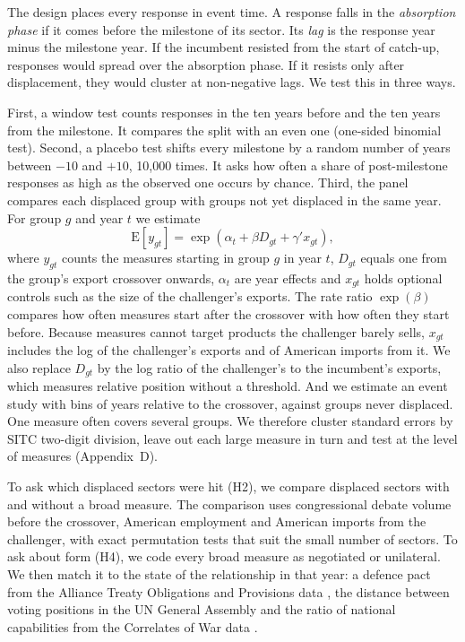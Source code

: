 \documentclass[review,authoryear,12pt]{elsarticle}
\begin{document}
The design places every response in event time. A response falls in the \emph{absorption phase} if it comes before the milestone of its sector. Its \emph{lag} is the response year minus the milestone year. If the incumbent resisted from the start of catch-up, responses would spread over the absorption phase. If it resists only after displacement, they would cluster at non-negative lags. We test this in three ways.

First, a window test counts responses in the ten years before and the ten years from the milestone. It compares the split with an even one (one-sided binomial test). Second, a placebo test shifts every milestone by a random number of years between $-10$ and $+10$, 10,000 times. It asks how often a share of post-milestone responses as high as the observed one occurs by chance. Third, the panel compares each displaced group with groups not yet displaced in the same year. For group $g$ and year $t$ we estimate
\begin{equation}
\mathrm{E}[y_{gt}] = \exp(\alpha_t + \beta D_{gt} + \gamma' x_{gt}),
\end{equation}
where $y_{gt}$ counts the measures starting in group $g$ in year $t$, $D_{gt}$ equals one from the group's export crossover onwards, $\alpha_t$ are year effects and $x_{gt}$ holds optional controls such as the size of the challenger's exports. The rate ratio $\exp(\beta)$ compares how often measures start after the crossover with how often they start before. Because measures cannot target products the challenger barely sells, $x_{gt}$ includes the log of the challenger's exports and of American imports from it. We also replace $D_{gt}$ by the log ratio of the challenger's to the incumbent's exports, which measures relative position without a threshold. And we estimate an event study with bins of years relative to the crossover, against groups never displaced. One measure often covers several groups. We therefore cluster standard errors by SITC two-digit division, leave out each large measure in turn and test at the level of measures (Appendix~D).

To ask which displaced sectors were hit (H2), we compare displaced sectors with and without a broad measure. The comparison uses congressional debate volume before the crossover, American employment \citep{nberces} and American imports from the challenger, with exact permutation tests that suit the small number of sectors. To ask about form (H4), we code every broad measure as negotiated or unilateral. We then match it to the state of the relationship in that year: a defence pact from the Alliance Treaty Obligations and Provisions data \citep{leeds2002}, the distance between voting positions in the UN General Assembly \citep{bailey2017} and the ratio of national capabilities from the Correlates of War data \citep{nmc}.
\end{document}
